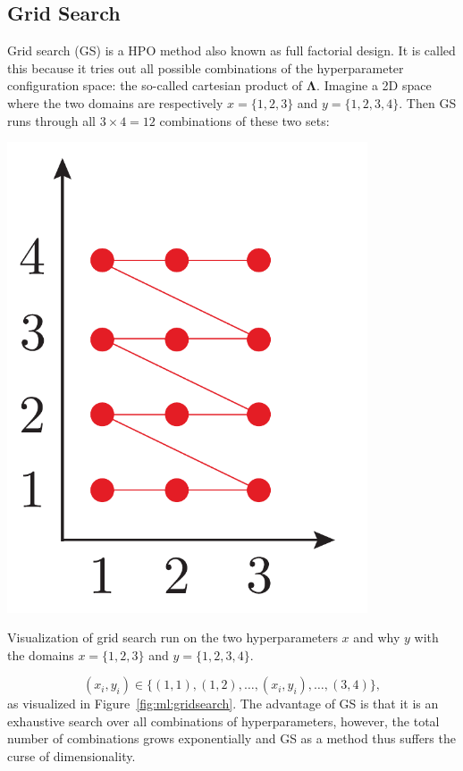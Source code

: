 \subsection{Grid Search}
\label{subsec:ml:grid_search}

Grid search (GS) is a HPO method also known as full factorial design. It is called this because it tries out all possible combinations of the hyperparameter configuration space: the so-called cartesian product of $\bm{\Lambda}$. Imagine a 2D space where the two domains are respectively $x=\{1, 2, 3\}$ and $y=\{1, 2, 3,4\}$. Then GS runs through all $3 \times 4 = 12$ combinations of these two sets: 

\begin{marginfigure}
  \includegraphics[width=0.8\textwidth]{figures/gridsearch/grid.pdf}
  \caption[Grid Search]{Visualization of grid search run on the two hyperparameters $x$ and why $y$ with the domains $x=\{1, 2, 3\}$ and $y=\{1, 2, 3,4\}$.}
  \label{fig:ml:gridsearch}
\end{marginfigure}

\begin{equation}
  (x_i, y_i) \in \{(1, 1), (1, 2), \dots, (x_i, y_i), \dots, (3, 4)\},
\end{equation}
as visualized in Figure~\ref{fig:ml:gridsearch}. The advantage of GS is that it is an exhaustive search over all combinations of hyperparameters, however, the total number of combinations grows exponentially and GS as a method thus suffers the curse of dimensionality.



